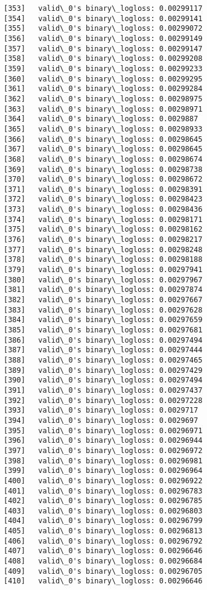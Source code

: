 \documentclass[11pt]{article}
\begin{document}
\begin{Verbatim}[commandchars=\\\{\}]
[353]	valid\_0's binary\_logloss: 0.00299117
[354]	valid\_0's binary\_logloss: 0.00299141
[355]	valid\_0's binary\_logloss: 0.00299072
[356]	valid\_0's binary\_logloss: 0.00299149
[357]	valid\_0's binary\_logloss: 0.00299147
[358]	valid\_0's binary\_logloss: 0.00299208
[359]	valid\_0's binary\_logloss: 0.00299233
[360]	valid\_0's binary\_logloss: 0.00299295
[361]	valid\_0's binary\_logloss: 0.00299284
[362]	valid\_0's binary\_logloss: 0.00298975
[363]	valid\_0's binary\_logloss: 0.00298971
[364]	valid\_0's binary\_logloss: 0.0029887
[365]	valid\_0's binary\_logloss: 0.00298933
[366]	valid\_0's binary\_logloss: 0.00298645
[367]	valid\_0's binary\_logloss: 0.00298645
[368]	valid\_0's binary\_logloss: 0.00298674
[369]	valid\_0's binary\_logloss: 0.00298738
[370]	valid\_0's binary\_logloss: 0.00298672
[371]	valid\_0's binary\_logloss: 0.00298391
[372]	valid\_0's binary\_logloss: 0.00298423
[373]	valid\_0's binary\_logloss: 0.00298436
[374]	valid\_0's binary\_logloss: 0.00298171
[375]	valid\_0's binary\_logloss: 0.00298162
[376]	valid\_0's binary\_logloss: 0.00298217
[377]	valid\_0's binary\_logloss: 0.00298248
[378]	valid\_0's binary\_logloss: 0.00298188
[379]	valid\_0's binary\_logloss: 0.00297941
[380]	valid\_0's binary\_logloss: 0.00297967
[381]	valid\_0's binary\_logloss: 0.00297874
[382]	valid\_0's binary\_logloss: 0.00297667
[383]	valid\_0's binary\_logloss: 0.00297628
[384]	valid\_0's binary\_logloss: 0.00297659
[385]	valid\_0's binary\_logloss: 0.00297681
[386]	valid\_0's binary\_logloss: 0.00297494
[387]	valid\_0's binary\_logloss: 0.00297444
[388]	valid\_0's binary\_logloss: 0.00297465
[389]	valid\_0's binary\_logloss: 0.00297429
[390]	valid\_0's binary\_logloss: 0.00297494
[391]	valid\_0's binary\_logloss: 0.00297437
[392]	valid\_0's binary\_logloss: 0.00297228
[393]	valid\_0's binary\_logloss: 0.0029717
[394]	valid\_0's binary\_logloss: 0.0029697
[395]	valid\_0's binary\_logloss: 0.00296971
[396]	valid\_0's binary\_logloss: 0.00296944
[397]	valid\_0's binary\_logloss: 0.00296972
[398]	valid\_0's binary\_logloss: 0.00296981
[399]	valid\_0's binary\_logloss: 0.00296964
[400]	valid\_0's binary\_logloss: 0.00296922
[401]	valid\_0's binary\_logloss: 0.00296783
[402]	valid\_0's binary\_logloss: 0.00296785
[403]	valid\_0's binary\_logloss: 0.00296803
[404]	valid\_0's binary\_logloss: 0.00296799
[405]	valid\_0's binary\_logloss: 0.00296813
[406]	valid\_0's binary\_logloss: 0.00296792
[407]	valid\_0's binary\_logloss: 0.00296646
[408]	valid\_0's binary\_logloss: 0.00296684
[409]	valid\_0's binary\_logloss: 0.00296705
[410]	valid\_0's binary\_logloss: 0.00296646

\end{Verbatim}
\end{document}
